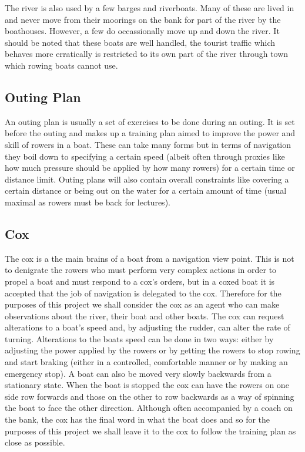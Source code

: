 The river is also used by a few barges and riverboats. Many of these
are lived in and never move from their moorings on the bank for part
of the river by the boathouses. However, a few do occassionally move
up and down the river. It should be noted that these boats are well
handled, the tourist traffic which behaves more erratically is
restricted to its own part of the river through town which rowing
boats cannot use.

\subsection{Outing Plan}
An outing plan is usually a set of exercises to be done during an
outing. It is set before the outing and makes up a training plan aimed
to improve the power and skill of rowers in a boat. These can take many forms but in terms of navigation they boil
down to specifying a certain speed (albeit often through proxies like
how much pressure should be applied by how many rowers) for a certain
time or distance limit. Outing plans will also contain overall
constraints like covering a certain distance or being out on the water
for a certain amount of time (usual maximal as rowers must be back for lectures).

\subsection{Cox}
The cox is a the main brains of a boat from a navigation view
point. This is not to denigrate the rowers who must perform very
complex actions in order to propel a boat and must respond to a cox's
orders, but in a coxed boat it is accepted that the job of navigation
is delegated to the cox. Therefore for the purposes of this project we
shall consider the cox as an agent who can make observations about the
river, their boat and other boats. The cox can request alterations to
a boat's speed and, by adjusting the rudder, can alter the rate of
turning. Alterations to the boats speed can be done in two ways:
either by adjusting the power applied by the rowers or by getting the
rowers to stop rowing and start braking (either in a controlled, comfortable manner
or by making an emergency stop). A boat can also be moved very
slowly backwards from a stationary state. When the boat is stopped the
cox can have the rowers on one side row forwards and those on the other
to row backwards as a way of spinning the boat to face the other
direction. Although often accompanied by a coach on the bank, the cox
has the final word in what the boat does and so for the purposes of
this project we shall leave it to the cox to follow the training plan
as close as possible.



